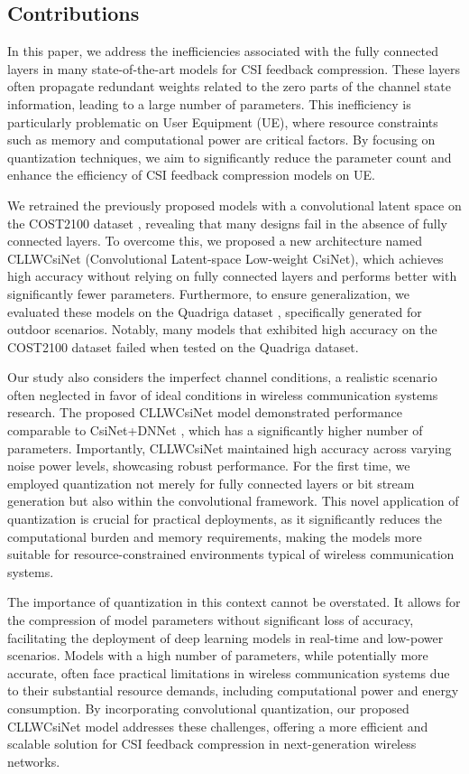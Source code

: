 \documentclass[lettersize,journal]{IEEEtran}
\begin{document}
\subsection{Contributions}

In this paper, we address the inefficiencies associated with the fully connected layers in many state-of-the-art models for CSI feedback compression. These layers often propagate redundant weights related to the zero parts of the channel state information, leading to a large number of parameters. This inefficiency is particularly problematic on User Equipment (UE), where resource constraints such as memory and computational power are critical factors. By focusing on quantization techniques, we aim to significantly reduce the parameter count and enhance the efficiency of CSI feedback compression models on UE.

We retrained the previously proposed models with a convolutional latent space on the COST2100 dataset \cite{abf}, revealing that many designs fail in the absence of fully connected layers. To overcome this, we proposed a new architecture named CLLWCsiNet (Convolutional Latent-space Low-weight CsiNet), which achieves high accuracy without relying on fully connected layers and performs better with significantly fewer parameters. Furthermore, to ensure generalization, we evaluated these models on the Quadriga dataset \cite{abt}, specifically generated for outdoor scenarios. Notably, many models that exhibited high accuracy on the COST2100 dataset \cite{abf} failed when tested on the Quadriga dataset\cite{abt}.

Our study also considers the imperfect channel conditions, a realistic scenario often neglected in favor of ideal conditions in wireless communication systems research. The proposed CLLWCsiNet model demonstrated performance comparable to CsiNet+DNNet \cite{abw}, which has a significantly higher number of parameters. Importantly, CLLWCsiNet maintained high accuracy across varying noise power levels, showcasing robust performance. For the first time, we employed quantization not merely for fully connected layers or bit stream generation but also within the convolutional framework. This novel application of quantization is crucial for practical deployments, as it significantly reduces the computational burden and memory requirements, making the models more suitable for resource-constrained environments typical of wireless communication systems.

The importance of quantization in this context cannot be overstated. It allows for the compression of model parameters without significant loss of accuracy, facilitating the deployment of deep learning models in real-time and low-power scenarios. Models with a high number of parameters, while potentially more accurate, often face practical limitations in wireless communication systems due to their substantial resource demands, including computational power and energy consumption. By incorporating convolutional quantization, our proposed CLLWCsiNet model addresses these challenges, offering a more efficient and scalable solution for CSI feedback compression in next-generation wireless networks.
\end{document}
